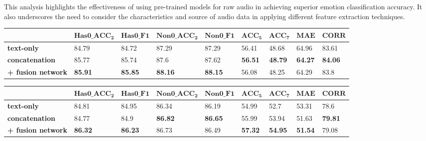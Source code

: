 \documentclass[11pt]{article}
\begin{document}
This analysis highlights the effectiveness of using pre-trained models for raw audio in achieving superior emotion classification accuracy. It also underscores the need to consider the characteristics and source of audio data in applying different feature extraction techniques.

\begin{table*}
\centering
\begin{subtable}{\textwidth}
\centering
\small
\setlength{\tabcolsep}{3pt}
\renewcommand{\arraystretch}{1.2}
\begin{tabular}{lllllllll}
\hline
 & $\mathbf{Has0\_ACC_2}$ & $\mathbf{Has0\_F1}$ & $\mathbf{Non0\_ACC_2}$ & $\mathbf{Non0\_F1}$ & $\mathbf{ACC_5}$ & $\mathbf{ACC_7}$ & $\mathbf{MAE}$ & $\mathbf{CORR}$ \\ \hline
\textbf{text-only} & 84.79 & 84.72 & 87.29 & 87.29 & 56.41 & 48.68 & 64.96 & 83.61 \\ \hline
\textbf{concatenation} & 85.77 & 85.74 & 87.6 & 87.62 & \textbf{56.51} & \textbf{48.79} & \textbf{64.27} & \textbf{84.06} \\ 
\textbf{+ fusion network} & \textbf{85.91} & \textbf{85.85} & \textbf{88.16} & \textbf{88.15} & 56.08 & 48.25 & 64.29 & 83.8 \\ \hline
\end{tabular}
\caption{CMU-MOSI}
\label{tab:CMU-MOSI2}
\end{subtable}
\vspace{0.3cm}
\begin{subtable}{\textwidth}
\centering
\small
\setlength{\tabcolsep}{3pt}
\renewcommand{\arraystretch}{1.2}
\begin{tabular}{lllllllll}
\hline
 & $\mathbf{Has0\_ACC_2}$ & $\mathbf{Has0\_F1}$ & $\mathbf{Non0\_ACC_2}$ & $\mathbf{Non0\_F1}$ & $\mathbf{ACC_5}$ & $\mathbf{ACC_7}$ & $\mathbf{MAE}$ & $\mathbf{CORR}$ \\ \hline
\textbf{text-only} & 84.81 & 84.95 & 86.34 & 86.19 & 54.99 & 52.7 & 53.31 & 78.6 \\ \hline
\textbf{concatenation} & 84.77 & 84.9 & \textbf{86.82} & \textbf{86.65} & 55.99 & 53.94 & 51.63 & \textbf{79.81} \\ 
\textbf{+ fusion network} & \textbf{86.32} & \textbf{86.23} & 86.73 & 86.49 & \textbf{57.32} & \textbf{54.95} & \textbf{51.54} & 79.08 \\ \hline
\end{tabular}
\caption{CMU-MOSEI}
\label{tab:CMU-MOSEI2}
\end{subtable}
\vspace{0.3cm}

\end{table*}
\end{document}
